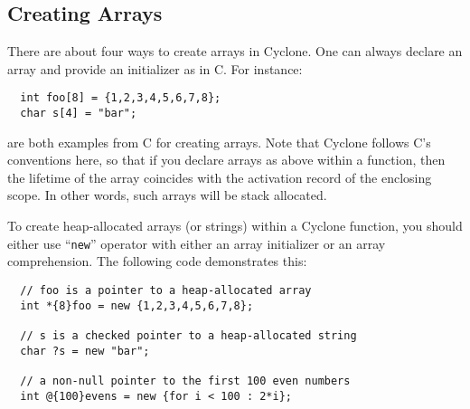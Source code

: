 
\subsection{Creating Arrays}
There are about four ways to create arrays in Cyclone. One can always
declare an array and provide an initializer as in C\@. For instance:
\begin{verbatim}
  int foo[8] = {1,2,3,4,5,6,7,8};
  char s[4] = "bar";
\end{verbatim}
are both examples from C for creating arrays.  Note that Cyclone
follows C's conventions here, so that if you declare arrays as above
within a function, then the lifetime of the array coincides with the
activation record of the enclosing scope.  In other words, such arrays
will be stack allocated.

To create heap-allocated arrays (or strings) within a Cyclone
function, you should either use ``\texttt{new}'' operator with either an
array initializer or an array comprehension. The following code
demonstrates this:
\begin{verbatim}
  // foo is a pointer to a heap-allocated array
  int *{8}foo = new {1,2,3,4,5,6,7,8};

  // s is a checked pointer to a heap-allocated string
  char ?s = new "bar";

  // a non-null pointer to the first 100 even numbers
  int @{100}evens = new {for i < 100 : 2*i};
\end{verbatim}


